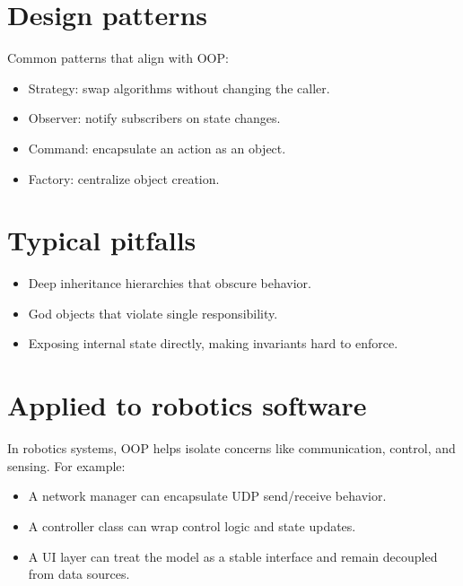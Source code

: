 \documentclass[letterpaper,10pt,english]{sphinxmanual}
\begin{document}
\section{Design patterns}
\label{\detokenize{appendix_a_object_oriented_programming:design-patterns}}
\sphinxAtStartPar
Common patterns that align with OOP:
\begin{itemize}
\item {} 
\sphinxAtStartPar
Strategy: swap algorithms without changing the caller.

\item {} 
\sphinxAtStartPar
Observer: notify subscribers on state changes.

\item {} 
\sphinxAtStartPar
Command: encapsulate an action as an object.

\item {} 
\sphinxAtStartPar
Factory: centralize object creation.

\end{itemize}


\section{Typical pitfalls}
\label{\detokenize{appendix_a_object_oriented_programming:typical-pitfalls}}\begin{itemize}
\item {} 
\sphinxAtStartPar
Deep inheritance hierarchies that obscure behavior.

\item {} 
\sphinxAtStartPar
God objects that violate single responsibility.

\item {} 
\sphinxAtStartPar
Exposing internal state directly, making invariants hard to enforce.

\end{itemize}


\section{Applied to robotics software}
\label{\detokenize{appendix_a_object_oriented_programming:applied-to-robotics-software}}
\sphinxAtStartPar
In robotics systems, OOP helps isolate concerns like communication, control,
and sensing. For example:
\begin{itemize}
\item {} 
\sphinxAtStartPar
A network manager can encapsulate UDP send/receive behavior.

\item {} 
\sphinxAtStartPar
A controller class can wrap control logic and state updates.

\item {} 
\sphinxAtStartPar
A UI layer can treat the model as a stable interface and remain decoupled
from data sources.

\end{itemize}
\end{document}
